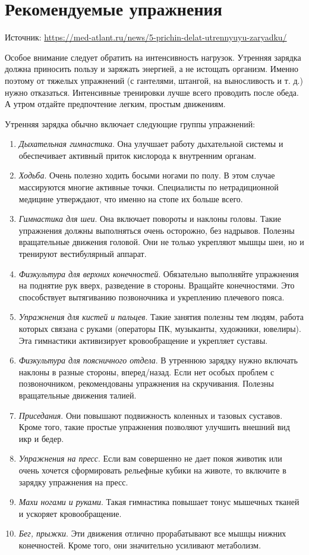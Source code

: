 \section{Рекомендуемые упражнения}
Источник: \url{https://med-atlant.ru/news/5-prichin-delat-utrennyuyu-zaryadku/}

Особое внимание следует обратить на интенсивность нагрузок. Утренняя зарядка должна приносить пользу и заряжать энергией, а не истощать организм. Именно поэтому от тяжелых упражнений (с гантелями, штангой, на выносливость и т. д.) нужно отказаться. Интенсивные тренировки лучше всего проводить после обеда. А утром отдайте предпочтение легким, простым движениям.

Утренняя зарядка обычно включает следующие группы упражнений:
\begin{enumerate}
    \item \textit{Дыхательная гимнастика}. Она улучшает работу дыхательной системы и обеспечивает активный приток кислорода к внутренним органам.
    \item \textit{Ходьба}. Очень полезно ходить босыми ногами по полу. В этом случае массируются многие активные точки. Специалисты по нетрадиционной медицине утверждают, что именно на стопе их больше всего.
    \item \textit{Гимнастика для шеи}. Она включает повороты и наклоны головы. Такие упражнения должны выполняться очень осторожно, без надрывов. Полезны вращательные движения головой. Они не только укрепляют мышцы шеи, но и тренируют вестибулярный аппарат.
    \item \textit{Физкультура для верхних конечностей}. Обязательно выполняйте упражнения на поднятие рук вверх, разведение в стороны. Вращайте конечностями. Это способствует вытягиванию позвоночника и укреплению плечевого пояса.
    \item \textit{Упражнения для кистей и пальцев}. Такие занятия полезны тем людям, работа которых связана с руками (операторы ПК, музыканты, художники, ювелиры). Эта гимнастики активизирует кровообращение и укрепляет суставы.
    \item \textit{Физкультура для поясничного отдела}. В утреннюю зарядку нужно включать наклоны в разные стороны, вперед/назад. Если нет особых проблем с позвоночником, рекомендованы упражнения на скручивания. Полезны вращательные движения талией.
    \item \textit{Приседания}. Они повышают подвижность коленных и тазовых суставов. Кроме того, такие простые упражнения позволяют улучшить внешний вид икр и бедер.
    \item \textit{Упражнения на пресс}. Если вам совершенно не дает покоя животик или очень хочется сформировать рельефные кубики на животе, то включите в зарядку упражнения на пресс.
    \item \textit{Махи ногами и руками}. Такая гимнастика повышает тонус мышечных тканей и ускоряет кровообращение.
    \item \textit{Бег, прыжки}. Эти движения отлично прорабатывают все мышцы нижних конечностей. Кроме того, они значительно усиливают метаболизм.
\end{enumerate}
